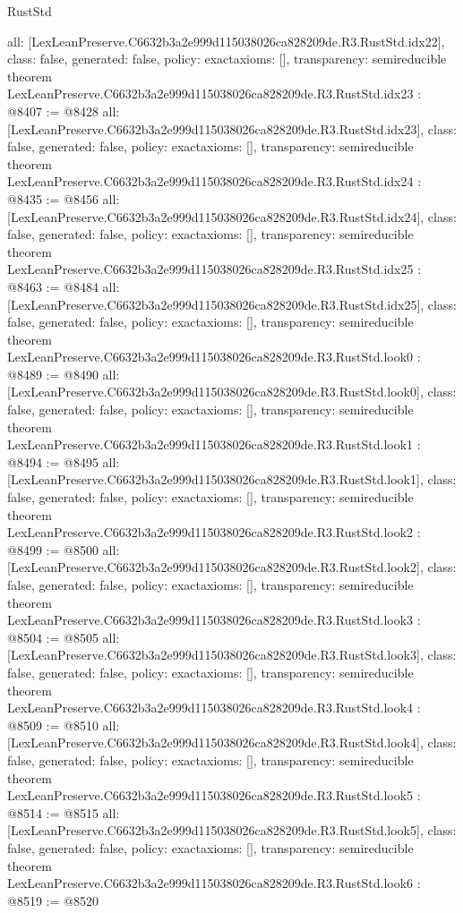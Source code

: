 \begin{lexlean}{RustStd}
\begin{coremodule}
{  all: [LexLeanPreserve.C6632b3a2e999d115038026ca828209de.R3.RustStd.idx22],
  class: false,
  generated: false,
  policy: exact{axioms: []},
  transparency: semireducible
}
theorem LexLeanPreserve.C6632b3a2e999d115038026ca828209de.R3.RustStd.idx23 : @8407 := @8428 {
  all: [LexLeanPreserve.C6632b3a2e999d115038026ca828209de.R3.RustStd.idx23],
  class: false,
  generated: false,
  policy: exact{axioms: []},
  transparency: semireducible
}
theorem LexLeanPreserve.C6632b3a2e999d115038026ca828209de.R3.RustStd.idx24 : @8435 := @8456 {
  all: [LexLeanPreserve.C6632b3a2e999d115038026ca828209de.R3.RustStd.idx24],
  class: false,
  generated: false,
  policy: exact{axioms: []},
  transparency: semireducible
}
theorem LexLeanPreserve.C6632b3a2e999d115038026ca828209de.R3.RustStd.idx25 : @8463 := @8484 {
  all: [LexLeanPreserve.C6632b3a2e999d115038026ca828209de.R3.RustStd.idx25],
  class: false,
  generated: false,
  policy: exact{axioms: []},
  transparency: semireducible
}
theorem LexLeanPreserve.C6632b3a2e999d115038026ca828209de.R3.RustStd.look0 : @8489 := @8490 {
  all: [LexLeanPreserve.C6632b3a2e999d115038026ca828209de.R3.RustStd.look0],
  class: false,
  generated: false,
  policy: exact{axioms: []},
  transparency: semireducible
}
theorem LexLeanPreserve.C6632b3a2e999d115038026ca828209de.R3.RustStd.look1 : @8494 := @8495 {
  all: [LexLeanPreserve.C6632b3a2e999d115038026ca828209de.R3.RustStd.look1],
  class: false,
  generated: false,
  policy: exact{axioms: []},
  transparency: semireducible
}
theorem LexLeanPreserve.C6632b3a2e999d115038026ca828209de.R3.RustStd.look2 : @8499 := @8500 {
  all: [LexLeanPreserve.C6632b3a2e999d115038026ca828209de.R3.RustStd.look2],
  class: false,
  generated: false,
  policy: exact{axioms: []},
  transparency: semireducible
}
theorem LexLeanPreserve.C6632b3a2e999d115038026ca828209de.R3.RustStd.look3 : @8504 := @8505 {
  all: [LexLeanPreserve.C6632b3a2e999d115038026ca828209de.R3.RustStd.look3],
  class: false,
  generated: false,
  policy: exact{axioms: []},
  transparency: semireducible
}
theorem LexLeanPreserve.C6632b3a2e999d115038026ca828209de.R3.RustStd.look4 : @8509 := @8510 {
  all: [LexLeanPreserve.C6632b3a2e999d115038026ca828209de.R3.RustStd.look4],
  class: false,
  generated: false,
  policy: exact{axioms: []},
  transparency: semireducible
}
theorem LexLeanPreserve.C6632b3a2e999d115038026ca828209de.R3.RustStd.look5 : @8514 := @8515 {
  all: [LexLeanPreserve.C6632b3a2e999d115038026ca828209de.R3.RustStd.look5],
  class: false,
  generated: false,
  policy: exact{axioms: []},
  transparency: semireducible
}
theorem LexLeanPreserve.C6632b3a2e999d115038026ca828209de.R3.RustStd.look6 : @8519 := @8520 {
}
\end{coremodule}
\end{lexlean}
